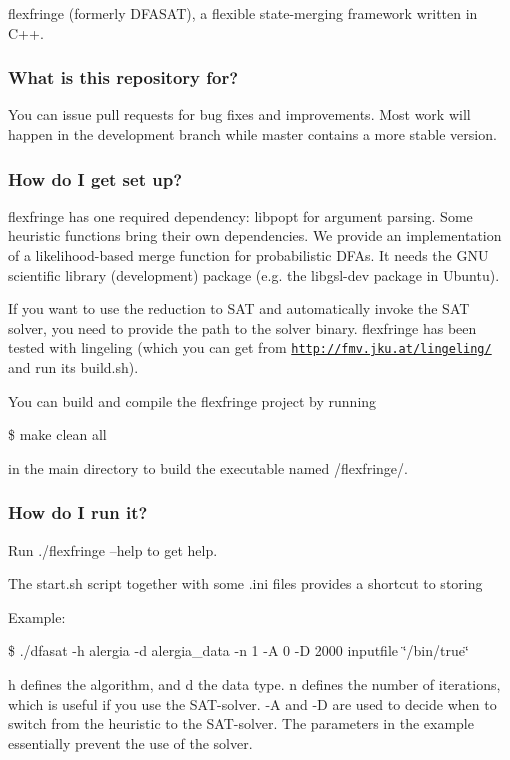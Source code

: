 flexfringe (formerly D\+F\+A\+S\+AT), a flexible state-\/merging framework written in C++.

\subsubsection*{What is this repository for?}

You can issue pull requests for bug fixes and improvements. Most work will happen in the development branch while master contains a more stable version.

\subsubsection*{How do I get set up?}

flexfringe has one required dependency\+: libpopt for argument parsing. Some heuristic functions bring their own dependencies. We provide an implementation of a likelihood-\/based merge function for probabilistic D\+F\+As. It needs the G\+NU scientific library (development) package (e.\+g. the libgsl-\/dev package in Ubuntu).

If you want to use the reduction to S\+AT and automatically invoke the S\+AT solver, you need to provide the path to the solver binary. flexfringe has been tested with lingeling (which you can get from \href{http://fmv.jku.at/lingeling/}{\tt http\+://fmv.\+jku.\+at/lingeling/} and run its build.\+sh).

You can build and compile the flexfringe project by running

\$ make clean all

in the main directory to build the executable named /flexfringe/.

\subsubsection*{How do I run it?}

Run ./flexfringe --help to get help.

The start.\+sh script together with some .ini files provides a shortcut to storing

Example\+:

\$ ./dfasat -\/h alergia -\/d alergia\+\_\+data -\/n 1 -\/A 0 -\/D 2000 inputfile \char`\"{}/bin/true\char`\"{}

h defines the algorithm, and d the data type. n defines the number of iterations, which is useful if you use the S\+A\+T-\/solver. -\/A and -\/D are used to decide when to switch from the heuristic to the S\+A\+T-\/solver. The parameters in the example essentially prevent the use of the solver.

